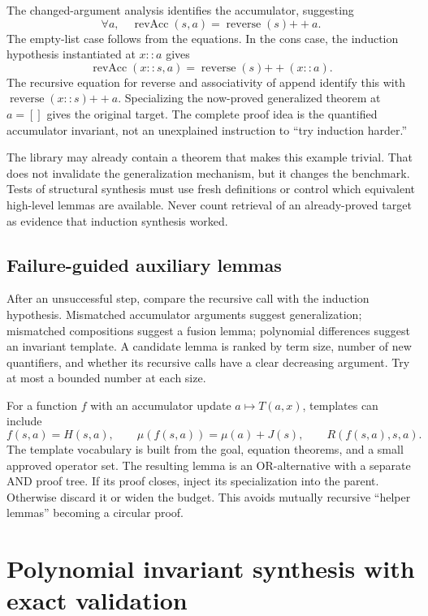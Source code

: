 \documentclass[11pt,a4paper]{article}
\begin{document}
The changed-argument analysis identifies the accumulator, suggesting
\begin{equation}\label{eq:rev-inv}
 \forall a,\quad \operatorname{revAcc}(s,a)
       =\operatorname{reverse}(s)\mathbin{+\!+}a.
\end{equation}
The empty-list case follows from the equations. In the cons case, the induction
hypothesis instantiated at $x::a$ gives
\[
 \operatorname{revAcc}(x::s,a)
 =\operatorname{reverse}(s)\mathbin{+\!+}(x::a).
\]
The recursive equation for reverse and associativity of append identify this
with $\operatorname{reverse}(x::s)\mathbin{+\!+}a$.
Specializing the now-proved generalized theorem at $a=[]$ gives the original
target. The complete proof idea is the quantified accumulator invariant, not
an unexplained instruction to ``try induction harder.''

The library may already contain a theorem that makes this example trivial.
That does not invalidate the generalization mechanism, but it changes the
benchmark. Tests of structural synthesis must use fresh definitions or control
which equivalent high-level lemmas are available. Never count retrieval of an
already-proved target as evidence that induction synthesis worked.

\subsection{Failure-guided auxiliary lemmas}

After an unsuccessful step, compare the recursive call with the induction
hypothesis. Mismatched accumulator arguments suggest generalization;
mismatched compositions suggest a fusion lemma; polynomial differences suggest
an invariant template. A candidate lemma is ranked by term size, number of new
quantifiers, and whether its recursive calls have a clear decreasing argument.
Try at most a bounded number at each size.

For a function $f$ with an accumulator update $a\mapsto T(a,x)$, templates can
include
\[
 f(s,a)=H(s,a),\qquad
 \mu(f(s,a))=\mu(a)+J(s),\qquad
 R(f(s,a),s,a).
\]
The template vocabulary is built from the goal, equation theorems, and a small
approved operator set. The resulting lemma is an OR-alternative with a separate
AND proof tree. If its proof closes, inject its specialization into the parent.
Otherwise discard it or widen the budget. This avoids mutually recursive
``helper lemmas'' becoming a circular proof.

\section{Polynomial invariant synthesis with exact validation}
\end{document}
